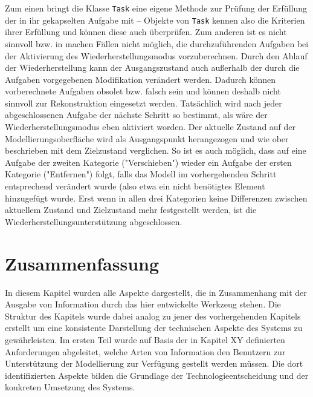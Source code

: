 Zum einen bringt die Klasse \texttt{Task} eine eigene Methode zur Prüfung der Erfüllung der in ihr gekapselten Aufgabe mit -- Objekte von \texttt{Task} kennen also die Kriterien ihrer Erfüllung und können diese auch überprüfen. Zum anderen ist es nicht sinnvoll bzw. in machen Fällen nicht möglich, die durchzuführenden Aufgaben bei der Aktivierung des Wiederherstellungsmodus vorzuberechnen. Durch den Ablauf der Wiederherstellung kann der Ausgangszustand auch außerhalb der durch die Aufgaben vorgegebenen Modifikation verändert werden. Dadurch können vorberechnete Aufgaben obsolet bzw. falsch sein und können deshalb nicht sinnvoll zur Rekonstruktion eingesetzt werden. Tatsächlich wird nach jeder abgeschlossenen Aufgabe der nächste Schritt so bestimmt, als wäre der Wiederherstellungsmodus eben aktiviert worden. Der aktuelle Zustand auf der Modellierungsoberfläche wird als Ausgangspunkt herangezogen und wie ober beschrieben mit dem Zielzustand verglichen. So ist es auch möglich, dass auf eine Aufgabe der zweiten Kategorie ("Verschieben") wieder ein Aufgabe der ersten Kategorie ("Entfernen") folgt, falls das Modell im vorhergehenden Schritt entsprechend verändert wurde (also etwa ein nicht benötigtes Element hinzugefügt wurde. Erst wenn in allen drei Kategorien keine Differenzen zwischen aktuellem Zustand und Zielzustand mehr festgestellt werden, ist die Wiederherstellungsunterstützung abgeschlossen.


\section{Zusammenfassung} %
\label{sec:output_zusammenfassung}

In diesem Kapitel wurden alle Aspekte dargestellt, die in Zusammenhang mit der Ausgabe von Information durch das hier entwickelte Werkzeug stehen. Die Struktur des Kapitels wurde dabei analog zu jener des vorhergehenden Kapitels erstellt um eine konsistente Darstellung der technischen Aspekte des Systems zu gewährleisten. Im ersten Teil wurde auf Basis der in Kapitel XY definierten Anforderungen abgeleitet, welche Arten von Information den Benutzern zur Unterstützung der Modellierung zur Verfügung gestellt werden müssen. Die dort identifizierten Aspekte bilden die Grundlage der Technologieentscheidung und der konkreten Umsetzung des Systems.


